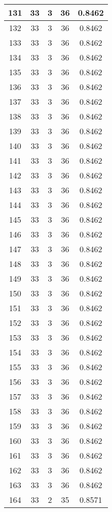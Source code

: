\documentclass[letterpaper, 12pt]{article}
\begin{document}
\begin{longtable}{|c|c|c|c|c|}
\hline
131 & 33 & 3 & 36 & 0.8462 \\
\hline
132 & 33 & 3 & 36 & 0.8462 \\
\hline
133 & 33 & 3 & 36 & 0.8462 \\
\hline
134 & 33 & 3 & 36 & 0.8462 \\
\hline
135 & 33 & 3 & 36 & 0.8462 \\
\hline
136 & 33 & 3 & 36 & 0.8462 \\
\hline
137 & 33 & 3 & 36 & 0.8462 \\
\hline
138 & 33 & 3 & 36 & 0.8462 \\
\hline
139 & 33 & 3 & 36 & 0.8462 \\
\hline
140 & 33 & 3 & 36 & 0.8462 \\
\hline
141 & 33 & 3 & 36 & 0.8462 \\
\hline
142 & 33 & 3 & 36 & 0.8462 \\
\hline
143 & 33 & 3 & 36 & 0.8462 \\
\hline
144 & 33 & 3 & 36 & 0.8462 \\
\hline
145 & 33 & 3 & 36 & 0.8462 \\
\hline
146 & 33 & 3 & 36 & 0.8462 \\
\hline
147 & 33 & 3 & 36 & 0.8462 \\
\hline
148 & 33 & 3 & 36 & 0.8462 \\
\hline
149 & 33 & 3 & 36 & 0.8462 \\
\hline
150 & 33 & 3 & 36 & 0.8462 \\
\hline
151 & 33 & 3 & 36 & 0.8462 \\
\hline
152 & 33 & 3 & 36 & 0.8462 \\
\hline
153 & 33 & 3 & 36 & 0.8462 \\
\hline
154 & 33 & 3 & 36 & 0.8462 \\
\hline
155 & 33 & 3 & 36 & 0.8462 \\
\hline
156 & 33 & 3 & 36 & 0.8462 \\
\hline
157 & 33 & 3 & 36 & 0.8462 \\
\hline
158 & 33 & 3 & 36 & 0.8462 \\
\hline
159 & 33 & 3 & 36 & 0.8462 \\
\hline
160 & 33 & 3 & 36 & 0.8462 \\
\hline
161 & 33 & 3 & 36 & 0.8462 \\
\hline
162 & 33 & 3 & 36 & 0.8462 \\
\hline
163 & 33 & 3 & 36 & 0.8462 \\
\hline
164 & 33 & 2 & 35 & 0.8571 \\

\end{longtable}
\end{document}
